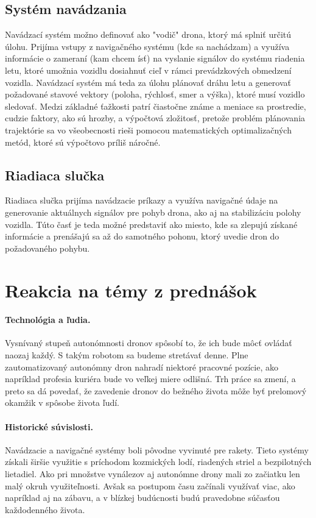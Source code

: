 \documentclass[10pt,twoside,slovak,a4paper]{article}
\begin{document}
\subsection{Systém navádzania}
Navádzací systém možno definovať ako "vodič" drona, ktorý má splniť určitú úlohu. Prijíma vstupy z navigačného systému (kde sa nachádzam) a využíva informácie o zameraní (kam chcem ísť) na vyslanie signálov do systému riadenia letu, ktoré umožnia vozidlu dosiahnuť cieľ v rámci prevádzkových obmedzení vozidla. Navádzací systém má teda za úlohu plánovať dráhu letu a generovať požadované stavové vektory (poloha, rýchlosť, smer a výška), ktoré musí vozidlo sledovať. Medzi základné ťažkosti patrí čiastočne známe a meniace sa prostredie, cudzie faktory, ako sú hrozby, a výpočtová zložitosť, pretože problém plánovania trajektórie sa vo všeobecnosti rieši pomocou matematických optimalizačných metód, ktoré sú výpočtovo príliš náročné. \cite{nonami2020present} \cite{nonami2010autonomous}

\subsection{Riadiaca slučka} 
Riadiaca slučka prijíma navádzacie príkazy a využíva navigačné údaje na generovanie aktuálnych signálov pre pohyb drona, ako aj na stabilizáciu polohy vozidla. Túto časť je teda možné predstaviť ako miesto, kde sa zlepujú získané informácie a prenášajú sa až do samotného pohonu, ktorý uvedie dron do požadovaného pohybu. \cite{nonami2020present} 

\section{Reakcia na témy z prednášok}
\paragraph{Technológia a ľudia.} Vysnívaný stupeň autonómnosti dronov spôsobí to, že ich bude môcť ovládať naozaj každý. S takým robotom sa budeme stretávať denne. Plne zautomatizovaný autonómny dron nahradí niektoré pracovné pozície, ako napríklad profesia kuriéra bude vo veľkej miere odlišná. Trh práce sa zmení, a preto sa dá povedať, že zavedenie dronov do bežného života môže byť prelomový okamžik v spôsobe života ľudí. 
\paragraph{Historické súvislosti.} Navádzacie a navigačné systémy boli pôvodne vyvinuté pre rakety. Tieto systémy získali širšie využitie s príchodom kozmických lodí, riadených striel a bezpilotných lietadiel. \cite{nonami2018all} Ako pri množstve vynálezov aj autonómne drony mali zo začiatku len malý okruh využiteľnosti. Avšak sa postupom času začínali využívať viac, ako napríklad aj na zábavu, a v blízkej budúcnosti budú pravedobne súčasťou každodenného života.  
\end{document}
